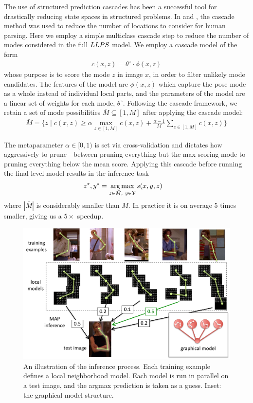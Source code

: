 The use of structured prediction cascades has been a successful tool for 
drastically reducing state spaces in structured problems.  In  and 
, the cascade method was used to reduce
the number of locations to consider for human parsing.  Here we employ a simple 
multiclass cascade step to reduce the number of modes considered in the full 
$LLPS$ model. We employ a cascade model of the form \begin{align}
c(x,z) = \theta^z \cdot \phi(x,z)
\end{align}
whose purpose is to score the mode $z$ in image $x$, in order to filter 
unlikely mode candidates.  The features of the model are $\phi(x,z)$ which 
capture the pose mode as a whole instead of individual local parts, and the 
parameters of the model are a linear set of weights for each mode, $\theta^z$.  
Following the cascade framework, we retain a set of mode possibilities $\bar{M} 
\subseteq [1,M]$ after applying the cascade model:
\begin{align}
\bar{M} = \{ z \;|\; c(x,z) \geq \alpha \max_{z \in [1,M]} c(x,z) + 
\frac{\alpha-1}{M} \sum_{z \in [1,M]} c(x,z) \}
\end{align}

The metaparameter $\alpha \in [0,1)$ is set via cross-validation and dictates 
how aggressively to prune---between pruning everything but the max scoring mode 
to pruning everything below the mean score.  Applying this cascade before 
running the final level \LLPS model results in the inference task
\begin{align}
z^\star,y^\star &= \mathop{\arg\max}_{z \in \bar{M},~y \in \mathcal{Y}} s(x,y,z) 
\end{align}
where $|\bar{M}|$ is considerably smaller than $M$.  In practice it is on 
average $5$ times smaller, giving us a $5\times$ speedup.

\begin{figure}[tb!]
\centering
\includegraphics[width=0.99\linewidth]{figs/llps-inference.pdf}
\caption[LLPS inference.]{\label{fig:llps-inference} An illustration of the 
inference process.  Each training example defines a local neighborhood model.  
Each model is run in parallel on a test image, and the argmax prediction is 
taken as a guess. Inset: the graphical model structure.}
\end{figure}


